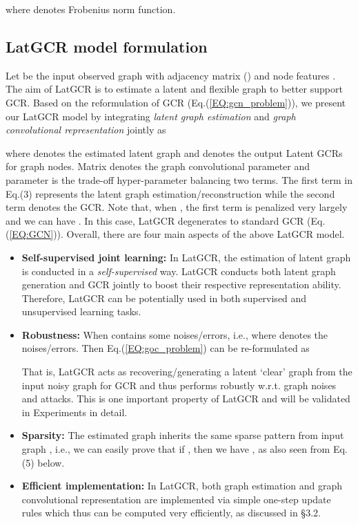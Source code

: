 \documentclass{article}
\begin{document}
where  denotes Frobenius norm function. 

\subsection{LatGCR model formulation}

Let  be the input observed graph with adjacency matrix  () and node features .
The aim of LatGCR is to estimate a latent and flexible graph  to better support GCR.
Based on the reformulation of GCR (Eq.(\ref{EQ:gcn_problem})), we present our LatGCR model by integrating
\emph{latent graph estimation} and \emph{graph convolutional representation} jointly as

where  denotes the estimated latent graph and  denotes the output Latent GCRs for graph nodes.
 Matrix  denotes the graph convolutional parameter and parameter  is the trade-off hyper-parameter  balancing two terms.
 The first term in Eq.(3) represents the latent graph estimation/reconstruction while the second term denotes the GCR.
Note that, when , the first term is penalized very largely and we can have . In this case,  LatGCR degenerates to standard GCR (Eq.(\ref{EQ:GCN})).
Overall, there are four main aspects of the above LatGCR model.

\begin{itemize}
\item \textbf{Self-supervised joint learning:} In LatGCR, the estimation of latent graph is conducted in a \emph{self-supervised} way. LatGCR conducts both latent graph generation and GCR jointly to boost their respective representation ability. Therefore, LatGCR can be potentially used in both supervised and unsupervised learning tasks.
\item \textbf{Robustness:} When  contains some noises/errors, i.e.,  where  denotes the noises/errors.
   Then Eq.(\ref{EQ:goc_problem}) can be re-formulated as

That is, LatGCR acts as recovering/generating a latent `clear' graph  from the input noisy graph  for GCR and thus performs robustly w.r.t. graph noises and attacks. This is one important property of LatGCR and will be validated in Experiments in detail.
\item \textbf{Sparsity:}
  The estimated graph  inherits the same sparse pattern from input graph , i.e., we can easily prove that
  if , then we have , as also seen from Eq.(5) below.
  \item \textbf{Efficient implementation:} In LatGCR, both graph estimation and graph convolutional representation are implemented via simple one-step update rules which thus can be computed very efficiently, as discussed in \S 3.2.


\end{itemize}
\end{document}
